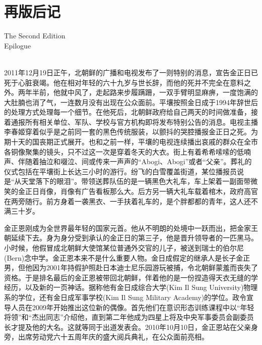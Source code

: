 \chapter*{再版后记}
\vspace{15mm}
\begin{flushright}
	\textcolor{PinYinColor}{\EN \huge{The Second Edition\\
			Epilogue\\
			\ \\}}
\end{flushright}

2011年12月19日正午，北朝鲜的广播和电视发布了一则特别的消息，宣告金正日已死于心脏衰竭。他在相对年轻的六十九岁与世长辞，而他的死并不完全在意料之外。两年半前，他就中风了，走起路来步履蹒跚，一双手臂明显麻痹，一度饱满的大肚腩也消了气，一连数月没有出现在公众面前。平壤按照金日成于1994年辞世后的处理方式处理每一个细节。在他死后，北朝鲜政府给自己两天的时间做准备，接着通报所有相关单位、军队、学校与官方机构即将发布特别公告的消息。电视主播李春姬穿着似乎是之前同一套的黑色传统服装，以颤抖的哭腔播报金正日之死。为期十天的国丧期正式展开。也和之前一样，平壤的电视连续播出哀戚的群众在全市各铜像聚集的镜头，只不过这一次是穿着冬天的大衣。街上有着希希嗦嗦的低喃声、伴随着抽泣和啜泣、间或传来一声声的“Abogi、Abogi”或者“父亲”。葬礼的仪式包括在平壤街上长达三小时的游行。纷飞的白雪覆盖街道，某位播报员说是“从天堂落下的眼泪”。带领送葬队伍的是一辆黑色大礼车，车上架着一副面带微笑的金正日肖像，肖像有广告看板那么大。后方另一辆大礼车载着棺木，政府高官在两旁随行。前方身着一袭黑衣、一手扶着礼车的，是个胖都都的青年，这人还不满三十岁。

金正恩刚成为全世界最年轻的国家元首。他从不明朗的处境中一跃而出，把金家王朝延续下去。身为身分受到承认的金正日的第三子，他是晋升领导者的一匹黑马。小时候，他假冒成北朝鲜大使馆某位普通外交官的儿子，被送到瑞士的伯尔尼(Bern)念中学。金正恩本来不是什么重要人物。金日成假定的继承人是长子金正男，但他因为2001年持假护照赴日本迪士尼乐园游玩被捕，令北朝鲜蒙羞而丧失了资格。于是排名最后的金正恩被带回北朝鲜，伴着他的是一份捏造得天衣无缝的学经历，以及新的一页神话。据称他有金日成综合大学(Kim Il Sung University)物理系的学位，还有金日成军事学校(Kim Il Sung Military Academy)的学位。政令宣导人员在2009年开始推出这位新的偶像。首先他们在意识形态训练课程中以“年轻将领”和“杰出同志”介绍他，直到第二年他成为四星上将及中央军事委员会副委员长才提及他的大名。这就等同于出道发表会。2010年10月10日，金正恩站在父亲身旁，出席劳动党六十五周年庆的盛大阅兵典礼，在公众面前亮相。

